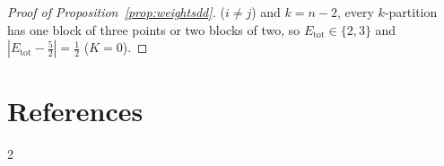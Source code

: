 \documentclass[11pt,a4paper]{article}
\theoremstyle{plain}
\theoremstyle{definition}
\theoremstyle{remark}
\newcommand{\tot}{\mathrm{tot}}
\begin{document}
\begin{proof}[Proof of Proposition~\ref{prop:weightsdd}]
($i\ne j$) and $k=n-2$, every $k$-partition has one block of three points or two blocks of two, so $E_\tot\in\{2,3\}$ and $|E_\tot-\tfrac52|=\tfrac12$ ($K=0$).
\end{proof}


\section*{References}
\renewcommand{\bibsection}{}
\raggedcolumns
\begin{multicols}{2}

\end{multicols}
\end{document}
